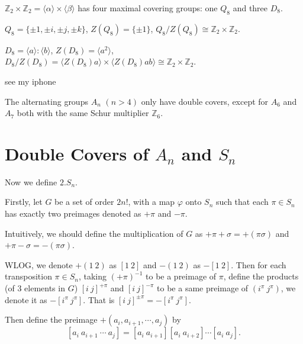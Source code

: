 \documentclass[a4paper,11pt]{article}
\def\subtitle#1{\section{#1}}
\begin{document}
\begin{example}
	$\mathbb{Z}_2\times\mathbb{Z}_2=\langle\alpha\rangle\times\langle\beta\rangle$ has four maximal covering groups: one $Q_8$ and three $D_8$. 

    $Q_8=\{\pm 1,\pm i,\pm j,\pm k\}$, $Z(Q_8)=\{\pm 1\}$, $Q_8/Z(Q_8)\cong\mathbb{Z}_2\times\mathbb{Z}_2$.
    
    $D_8=\langle a\rangle:\langle b\rangle$, $Z(D_8)=\langle a^2\rangle$, $D_8/Z(D_8)=\langle Z(D_8)a\rangle\times \langle Z(D_8)ab\rangle \cong\mathbb{Z}_2\times\mathbb{Z}_2$.

    see my iphone
\end{example}

\begin{example}
    The alternating groups $A_n$ $(n > 4)$ only have double covers, except for $A_6$ and $A_7$ both with the same Schur multiplier $\mathbb{Z}_6$.
\end{example}




\subtitle{Double Covers of $A_n$ and $S_n$}

Now we define $2.S_n$.

Firstly, let $G$ be a set of order $2n!$, with a map $\varphi$ onto $S_n$ such that each $\pi\in S_n$ has exactly two preimages denoted as $+\pi$ and $-\pi$. 

Intuitively, we should define the multiplication of $G$ as $+\pi+\sigma=+(\pi\sigma)$ and $+\pi-\sigma=-(\pi\sigma)$. 

WLOG, we denote $+(1\ 2)$ as $[1\ 2]$ and $-(1\ 2)$ as $-[1\ 2]$. Then for each transposition $\pi\in S_n$, taking $(+\pi)^{-1}$ to be a preimage of $\pi$, define the products (of 3 elements in $G$) $[i\ j]^{+\pi}$ and $[i\ j]^{-\pi}$ to be a same preimage of $(i^\pi\ j^\pi)$, we denote it as $-[i^\pi\ j^\pi]$. That is $[i\ j]^{\pm\pi}=-[i^\pi\ j^\pi]$. 

Then define the preimage $+(a_i, a_{i+1},\cdots, a_j)$ by \[[a_i\ a_{i+1}\ \cdots\ a_j]=[a_i\ a_{i+1}][a_i\ a_{i+2}]\cdots[a_i\ a_j].\]
\end{document}
